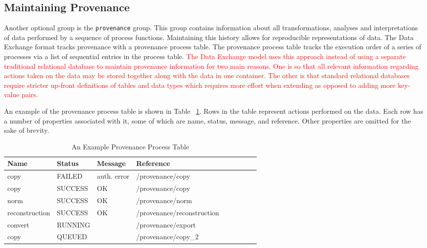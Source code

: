 \documentclass[pdf]{iucr}              %
\begin{document}
\subsection{Maintaining Provenance}

Another optional group is the \texttt{provenance} group. This group contains information about all transformations, analyses and interpretations of data performed by a sequence of process functions. Maintaining this history allows for reproducible representations of data. The Data Exchange format tracks provenance with a provenance process table. The provenance process table tracks the execution order of a series of processes via a list of sequential entries in the process table. \textcolor{red}{The Data Exchange model uses this approach instead of using a separate traditional relational database to maintain provenance information for two main reasons. One is so that all relevant information regarding actions taken on the data may be stored together along with the data in one container. The other is that standard relational databases require stricter up-front definitions of tables and data types which requires more effort when extending as opposed to adding more key-value pairs.}

An example of the provenance process table is shown in Table ~\ref{table:provenance}. Rows in the table represent actions performed on the data. Each row has a number of properties associated with it, some of which are name, status, message, and reference. Other properties are omitted for the sake of brevity.

\begin{table}
\centering
\footnotesize
\caption{An Example Provenance Process Table}
\label{table:provenance}
\begin{tabular}{l l l l l l l l l }
\toprule
\bfseries Name & \bfseries Status & \bfseries Message & \bfseries Reference \\
\midrule
copy & FAILED & auth. error & /provenance/copy  \\
copy & SUCCESS & OK & /provenance/copy  \\
norm & SUCCESS & OK & /provenance/norm  \\
reconstruction & SUCCESS & OK & /provenance/reconstruction  \\
convert & RUNNING & & /provenance/export  \\
copy & QUEUED & & /provenance/copy\_2 \\
\bottomrule
\end{tabular}
\end{table}
\end{document}

